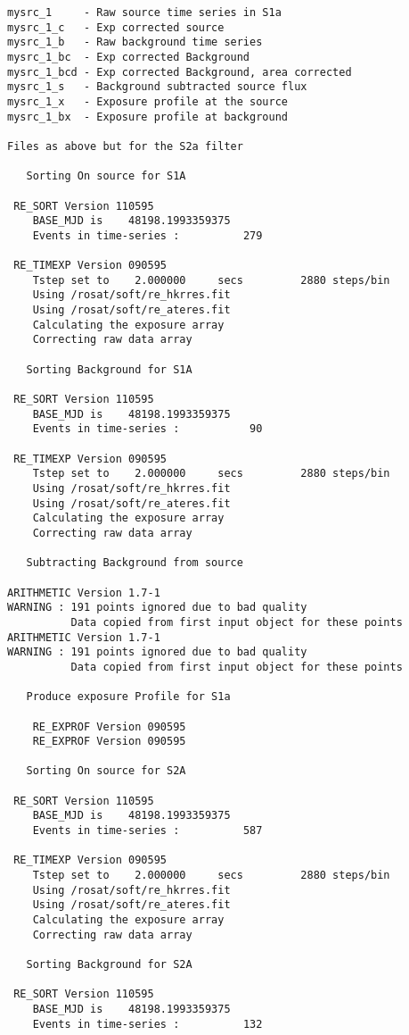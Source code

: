 \begin{small}
\begin{verbatim}
mysrc_1     - Raw source time series in S1a
mysrc_1_c   - Exp corrected source
mysrc_1_b   - Raw background time series
mysrc_1_bc  - Exp corrected Background
mysrc_1_bcd - Exp corrected Background, area corrected
mysrc_1_s   - Background subtracted source flux
mysrc_1_x   - Exposure profile at the source
mysrc_1_bx  - Exposure profile at background
 
Files as above but for the S2a filter
 
   Sorting On source for S1A

 RE_SORT Version 110595   
    BASE_MJD is    48198.1993359375     
    Events in time-series :          279

 RE_TIMEXP Version 090595      
    Tstep set to    2.000000     secs         2880 steps/bin
    Using /rosat/soft/re_hkrres.fit
    Using /rosat/soft/re_ateres.fit
    Calculating the exposure array
    Correcting raw data array
 
   Sorting Background for S1A

 RE_SORT Version 110595   
    BASE_MJD is    48198.1993359375     
    Events in time-series :           90

 RE_TIMEXP Version 090595      
    Tstep set to    2.000000     secs         2880 steps/bin
    Using /rosat/soft/re_hkrres.fit
    Using /rosat/soft/re_ateres.fit
    Calculating the exposure array
    Correcting raw data array
 
   Subtracting Background from source 
 
ARITHMETIC Version 1.7-1
WARNING : 191 points ignored due to bad quality
          Data copied from first input object for these points
ARITHMETIC Version 1.7-1
WARNING : 191 points ignored due to bad quality
          Data copied from first input object for these points
 
   Produce exposure Profile for S1a
 
    RE_EXPROF Version 090595
    RE_EXPROF Version 090595
 
   Sorting On source for S2A

 RE_SORT Version 110595   
    BASE_MJD is    48198.1993359375     
    Events in time-series :          587

 RE_TIMEXP Version 090595      
    Tstep set to    2.000000     secs         2880 steps/bin
    Using /rosat/soft/re_hkrres.fit
    Using /rosat/soft/re_ateres.fit
    Calculating the exposure array
    Correcting raw data array
 
   Sorting Background for S2A

 RE_SORT Version 110595   
    BASE_MJD is    48198.1993359375     
    Events in time-series :          132


\end{verbatim}
\end{small}
